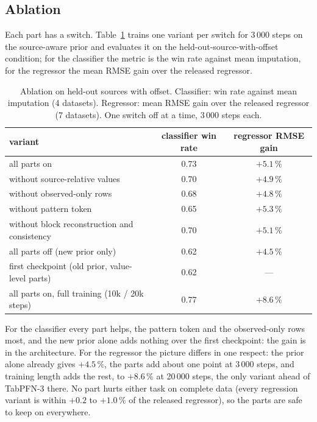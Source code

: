 \documentclass[11pt]{article}
\begin{document}
\subsection{Ablation}
\label{sec:ablation}

Each part has a switch. Table~\ref{tab:abl} trains one variant per switch for 3\,000
steps on the source-aware prior and evaluates it on the held-out-source-with-offset
condition; for the classifier the metric is the win rate against mean imputation, for
the regressor the mean RMSE gain over the released regressor.

\begin{table}[!htbp]
\centering\small
\caption{Ablation on held-out sources with offset. Classifier: win rate against mean
imputation (4 datasets). Regressor: mean RMSE gain over the released regressor (7
datasets). One switch off at a time, 3\,000 steps each.}
\label{tab:abl}
\begin{tabular}{lcc}
\toprule
variant & classifier win rate & regressor RMSE gain\\
\midrule
all parts on & 0.73 & $+5.1\,\%$\\
without source-relative values & 0.70 & $+4.9\,\%$\\
without observed-only rows & 0.68 & $+4.8\,\%$\\
without pattern token & 0.65 & $+5.3\,\%$\\
without block reconstruction and consistency & 0.70 & $+5.1\,\%$\\
all parts off (new prior only) & 0.62 & $+4.5\,\%$\\
first checkpoint (old prior, value-level parts) & 0.62 & ---\\
all parts on, full training (10k / 20k steps) & 0.77 & $+8.6\,\%$\\
\bottomrule
\end{tabular}
\end{table}

For the classifier every part helps, the pattern token and the observed-only rows
most, and the new prior alone adds nothing over the first checkpoint: the gain is in
the architecture. For the regressor the picture differs in one respect: the prior
alone already gives $+4.5\,\%$, the parts add about one point at 3\,000 steps, and
training length adds the rest, to $+8.6\,\%$ at 20\,000 steps, the only variant ahead
of TabPFN-3 there. No part hurts either task on complete data (every regression
variant is within $+0.2$ to $+1.0\,\%$ of the released regressor), so the parts are
safe to keep on everywhere.
\end{document}
